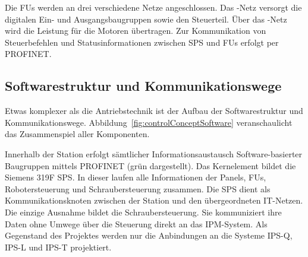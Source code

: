 Die FUs werden an drei verschiedene Netze angeschlossen. Das -Netz versorgt die digitalen Ein- und Ausgangsbaugruppen sowie den Steuerteil. Über das -Netz wird die Leistung für die Motoren übertragen. Zur Kommunikation von Steuerbefehlen und Statusinformationen zwischen SPS und FUs erfolgt per PROFINET.

\subsection*{Softwarestruktur und Kommunikationswege}


Etwas komplexer als die Antriebstechnik ist der Aufbau der Softwarestruktur und Kommunikationswege. Abbildung~\ref{fig:controlConceptSoftware} veranschaulicht das Zusammenspiel aller Komponenten.

Innerhalb der Station erfolgt sämtlicher Informationsaustausch Software-basierter Baugruppen mittels PROFINET (grün dargestellt). Das Kernelement bildet die Siemens 319F SPS. In dieser laufen alle Informationen der Panels, FUs, Robotersteuerung und Schraubersteuerung zusammen.
Die SPS dient als Kommunikationsknoten zwischen der Station und den übergeordneten IT-Netzen. Die einzige Ausnahme bildet die Schraubersteuerung. Sie kommuniziert ihre Daten ohne Umwege über die Steuerung direkt an das IPM-System.
Als Gegenstand des Projektes werden nur die Anbindungen an die Systeme IPS-Q, IPS-L und IPS-T projektiert.


%
